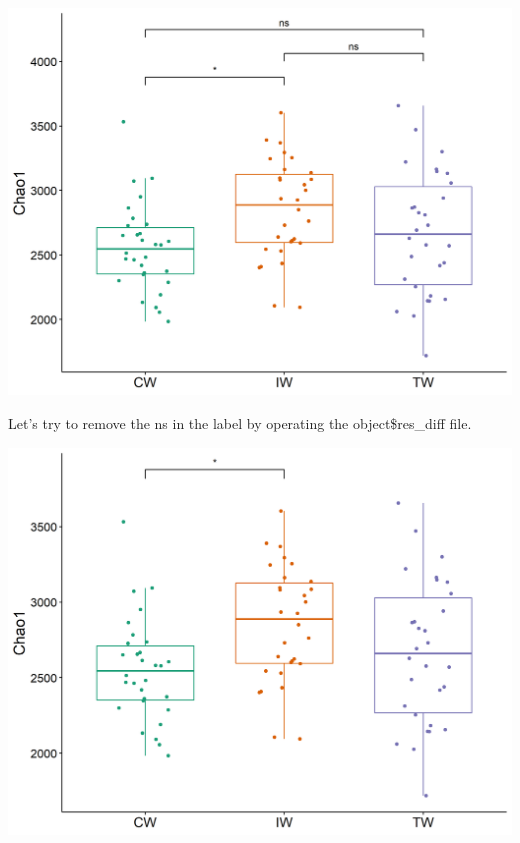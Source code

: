 \documentclass[
]{book}
\newenvironment{Shaded}{\begin{snugshade}}{\end{snugshade}}
\newcommand{\AttributeTok}[1]{\textcolor[rgb]{0.77,0.63,0.00}{#1}}
\newcommand{\DecValTok}[1]{\textcolor[rgb]{0.00,0.00,0.81}{#1}}
\newcommand{\FunctionTok}[1]{\textcolor[rgb]{0.00,0.00,0.00}{#1}}
\newcommand{\NormalTok}[1]{#1}
\newcommand{\SpecialCharTok}[1]{\textcolor[rgb]{0.00,0.00,0.00}{#1}}
\newcommand{\StringTok}[1]{\textcolor[rgb]{0.31,0.60,0.02}{#1}}
\begin{document}
\begin{center}\includegraphics[width=600px]{Images/plot_alpha_wilcox} \end{center}

Let's try to remove the ns in the label by operating the object\$res\_diff file.

\begin{Shaded}
\end{Shaded}

\begin{center}\includegraphics[width=600px]{Images/plot_alpha_wilcox_nons} \end{center}
\end{document}
